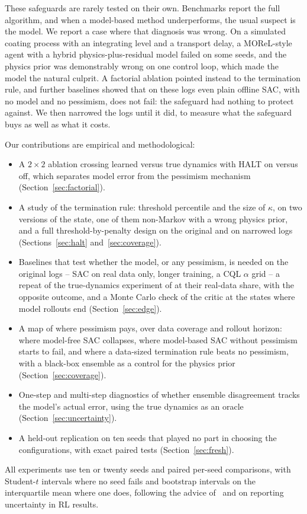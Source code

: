 \documentclass[11pt]{article}
\begin{document}
These safeguards are rarely tested on their own. Benchmarks report the full algorithm, and when a model-based method underperforms, the usual suspect is the model. We report a case where that diagnosis was wrong. On a simulated coating process with an integrating level and a transport delay, a MOReL-style agent with a hybrid physics-plus-residual model failed on some seeds, and the physics prior was demonstrably wrong on one control loop, which made the model the natural culprit. A factorial ablation pointed instead to the termination rule, and further baselines showed that on these logs even plain offline SAC, with no model and no pessimism, does not fail: the safeguard had nothing to protect against. We then narrowed the logs until it did, to measure what the safeguard buys as well as what it costs.

Our contributions are empirical and methodological:
\begin{itemize}
  \item A $2\times2$ ablation crossing learned versus true dynamics with HALT on versus off, which separates model error from the pessimism mechanism (Section~\ref{sec:factorial}).
  \item A study of the termination rule: threshold percentile and the size of $\kappa$, on two versions of the state, one of them non-Markov with a wrong physics prior, and a full threshold-by-penalty design on the original and on narrowed logs (Sections~\ref{sec:halt} and~\ref{sec:coverage}).
  \item Baselines that test whether the model, or any pessimism, is needed on the original logs -- SAC on real data only, longer training, a CQL $\alpha$ grid -- a repeat of the true-dynamics experiment of \citet{sims2024edge} at their real-data share, with the opposite outcome, and a Monte Carlo check of the critic at the states where model rollouts end (Section~\ref{sec:edge}).
  \item A map of where pessimism pays, over data coverage and rollout horizon: where model-free SAC collapses, where model-based SAC without pessimism starts to fail, and where a data-sized termination rule beats no pessimism, with a black-box ensemble as a control for the physics prior (Section~\ref{sec:coverage}).
  \item One-step and multi-step diagnostics of whether ensemble disagreement tracks the model's actual error, using the true dynamics as an oracle (Section~\ref{sec:uncertainty}).
  \item A held-out replication on ten seeds that played no part in choosing the configurations, with exact paired tests (Section~\ref{sec:fresh}).
\end{itemize}
All experiments use ten or twenty seeds and paired per-seed comparisons, with Student-$t$ intervals where no seed fails and bootstrap intervals on the interquartile mean where one does, following the advice of~\citet{henderson2018matters} and \citet{agarwal2021precipice} on reporting uncertainty in RL results.
\end{document}

